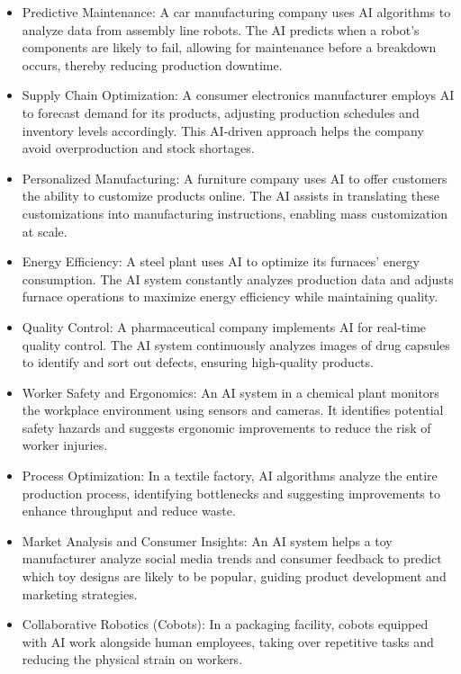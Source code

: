 \documentclass[
  letterpaper,
  DIV=11,
  numbers=noendperiod]{scrartcl}
\providecommand{\tightlist}{%
  \setlength{\itemsep}{0pt}\setlength{\parskip}{0pt}}\usepackage{longtable,booktabs,array}
\begin{document}
\begin{itemize}
\tightlist
\item
  Predictive Maintenance: A car manufacturing company uses AI algorithms
  to analyze data from assembly line robots. The AI predicts when a
  robot's components are likely to fail, allowing for maintenance before
  a breakdown occurs, thereby reducing production downtime.
\item
  Supply Chain Optimization: A consumer electronics manufacturer employs
  AI to forecast demand for its products, adjusting production schedules
  and inventory levels accordingly. This AI-driven approach helps the
  company avoid overproduction and stock shortages.
\item
  Personalized Manufacturing: A furniture company uses AI to offer
  customers the ability to customize products online. The AI assists in
  translating these customizations into manufacturing instructions,
  enabling mass customization at scale.
\item
  Energy Efficiency: A steel plant uses AI to optimize its furnaces'
  energy consumption. The AI system constantly analyzes production data
  and adjusts furnace operations to maximize energy efficiency while
  maintaining quality.
\item
  Quality Control: A pharmaceutical company implements AI for real-time
  quality control. The AI system continuously analyzes images of drug
  capsules to identify and sort out defects, ensuring high-quality
  products.
\item
  Worker Safety and Ergonomics: An AI system in a chemical plant
  monitors the workplace environment using sensors and cameras. It
  identifies potential safety hazards and suggests ergonomic
  improvements to reduce the risk of worker injuries.
\item
  Process Optimization: In a textile factory, AI algorithms analyze the
  entire production process, identifying bottlenecks and suggesting
  improvements to enhance throughput and reduce waste.
\item
  Market Analysis and Consumer Insights: An AI system helps a toy
  manufacturer analyze social media trends and consumer feedback to
  predict which toy designs are likely to be popular, guiding product
  development and marketing strategies.
\item
  Collaborative Robotics (Cobots): In a packaging facility, cobots
  equipped with AI work alongside human employees, taking over
  repetitive tasks and reducing the physical strain on workers.

\end{itemize}
\end{document}
